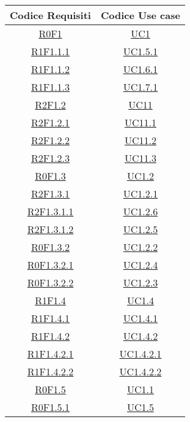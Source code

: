 \normalsize
\begin{longtable}{|c|c|}
\hline
\textbf{Codice Requisiti} & \textbf{Codice Use case} \\
\hline
\endhead
\hyperlink{R0F1}{R0F1} & \hyperlink{UC1}{UC1}\\
\hline
\hyperlink{R1F1.1.1}{R1F1.1.1} & \hyperlink{UC1.5.1}{UC1.5.1}\\
\hline
\hyperlink{R1F1.1.2}{R1F1.1.2} & \hyperlink{UC1.6.1}{UC1.6.1}\\
\hline
\hyperlink{R1F1.1.3}{R1F1.1.3} & \hyperlink{UC1.7.1}{UC1.7.1}\\
\hline
\hyperlink{R2F1.2}{R2F1.2} & \hyperlink{UC11}{UC11}\\
\hline
\hyperlink{R2F1.2.1}{R2F1.2.1} & \hyperlink{UC11.1}{UC11.1}\\
\hline
\hyperlink{R2F1.2.2}{R2F1.2.2} & \hyperlink{UC11.2}{UC11.2}\\
\hline
\hyperlink{R2F1.2.3}{R2F1.2.3} & \hyperlink{UC11.3}{UC11.3}\\
\hline
\hyperlink{R0F1.3}{R0F1.3} & \hyperlink{UC1.2}{UC1.2}\\
\hline
\hyperlink{R2F1.3.1}{R2F1.3.1} & \hyperlink{UC1.2.1}{UC1.2.1}\\
\hline
\hyperlink{R2F1.3.1.1}{R2F1.3.1.1} & \hyperlink{UC1.2.6}{UC1.2.6}\\
\hline
\hyperlink{R2F1.3.1.2}{R2F1.3.1.2} & \hyperlink{UC1.2.5}{UC1.2.5}\\
\hline
\hyperlink{R0F1.3.2}{R0F1.3.2} & \hyperlink{UC1.2.2}{UC1.2.2}\\
\hline
\hyperlink{R0F1.3.2.1}{R0F1.3.2.1} & \hyperlink{UC1.2.4}{UC1.2.4}\\
\hline
\hyperlink{R0F1.3.2.2}{R0F1.3.2.2} & \hyperlink{UC1.2.3}{UC1.2.3}\\
\hline
\hyperlink{R1F1.4}{R1F1.4} & \hyperlink{UC1.4}{UC1.4}\\
\hline
\hyperlink{R1F1.4.1}{R1F1.4.1} & \hyperlink{UC1.4.1}{UC1.4.1}\\
\hline
\hyperlink{R1F1.4.2}{R1F1.4.2} & \hyperlink{UC1.4.2}{UC1.4.2}\\
\hline
\hyperlink{R1F1.4.2.1}{R1F1.4.2.1} & \hyperlink{UC1.4.2.1}{UC1.4.2.1}\\
\hline
\hyperlink{R1F1.4.2.2}{R1F1.4.2.2} & \hyperlink{UC1.4.2.2}{UC1.4.2.2}\\
\hline
\hyperlink{R0F1.5}{R0F1.5} & \hyperlink{UC1.1}{UC1.1}\\
\hline
\hyperlink{R0F1.5.1}{R0F1.5.1} & \hyperlink{UC1.5}{UC1.5}\\

\end{longtable}
